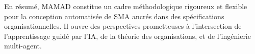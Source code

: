 \documentclass[pdflatex,sn-mathphys-num]{sn-jnl}%
\theoremstyle{thmstyleone}%
\theoremstyle{thmstyletwo}%
\theoremstyle{thmstylethree}%
\begin{document}
\noindent En résumé, MAMAD constitue un cadre méthodologique rigoureux et flexible pour la conception automatisée de SMA ancrés dans des spécifications organisationnelles. Il ouvre des perspectives prometteuses à l'intersection de l'apprentissage guidé par l'IA, de la théorie des organisations, et de l'ingénierie multi-agent.











\end{document}
